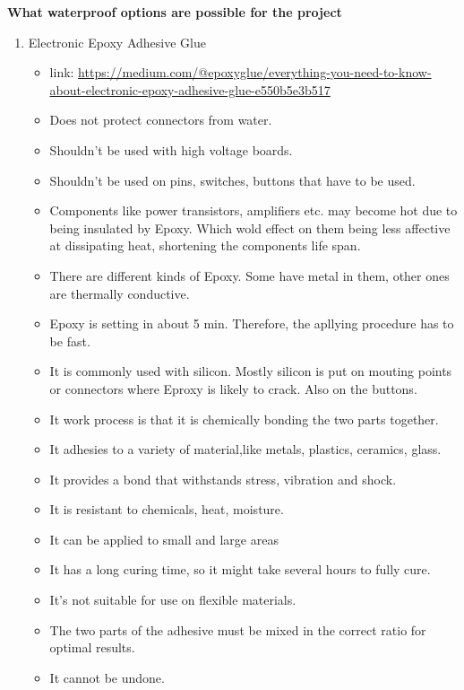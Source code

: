 \textbf{What waterproof options are possible for the project}
\begin{enumerate}
    \item Electronic Epoxy Adhesive Glue
          \begin{itemize}
              \item link: \url{https://medium.com/@epoxyglue/everything-you-need-to-know-about-electronic-epoxy-adhesive-glue-e550b5e3b517}
              \item Does not protect connectors from water.
              \item Shouldn't be used with high voltage boards.
              \item Shouldn't be used on pins, switches, buttons that have to be used.
              \item Components like power transistors, amplifiers etc. may become hot due to being insulated by Epoxy. Which wold effect on them being less affective at dissipating heat, shortening the components life span.
              \item There are different kinds of Epoxy. Some have metal in them, other ones are thermally conductive.
              \item Epoxy is setting in about 5 min. Therefore, the apllying procedure has to be fast.
              \item It is commonly used with silicon. Mostly silicon is put on mouting points or connectors where Eproxy is likely to crack. Also on the buttons.
              \item It work process is that it is chemically bonding the two parts together.
              \item It adhesies to a variety of material,like metals, plastics, ceramics, glass.
              \item It provides a bond that withstands stress, vibration and shock.
              \item It is resistant to chemicals, heat, moisture.
              \item It can be applied to small and large areas
              \item It has a long curing time, so it might take several hours to fully cure.
              \item It's not suitable for use on flexible materials.
              \item The two parts of the adhesive must be mixed in the correct ratio for optimal results.
              \item It cannot be undone.

\end{itemize}
\end{enumerate}
